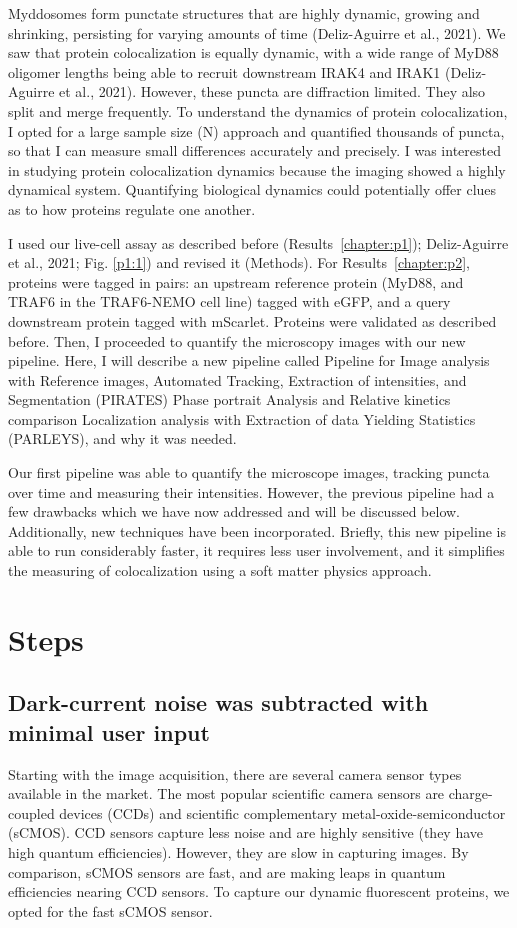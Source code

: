 Myddosomes form punctate structures that are highly dynamic, growing and shrinking, persisting for varying amounts of time (Deliz-Aguirre et al., 2021). We saw that protein colocalization is equally dynamic, with a wide range of MyD88 oligomer lengths being able to recruit downstream IRAK4 and IRAK1 (Deliz-Aguirre et al., 2021). However, these puncta are diffraction limited. They also split and merge frequently. To understand the dynamics of protein colocalization, I opted for a large sample size (N) approach and quantified thousands of puncta, so that I can measure small differences accurately and precisely. I was interested in studying protein colocalization dynamics because the imaging showed a highly dynamical system. Quantifying biological dynamics could potentially offer clues as to how proteins regulate one another.

I used our live-cell assay as described before (Results~\ref{chapter:p1}); Deliz-Aguirre et al., 2021; Fig. \ref{p1:1}) and revised it (Methods). For Results~\ref{chapter:p2}, proteins were tagged in pairs: an upstream reference protein (MyD88, and TRAF6 in the TRAF6-NEMO cell line) tagged with eGFP, and a query downstream protein tagged with mScarlet. Proteins were validated as described before. Then, I proceeded to quantify the microscopy images with our new pipeline. Here, I will describe a new pipeline called Pipeline for Image analysis with Reference images, Automated Tracking, Extraction of intensities, and Segmentation (PIRATES) Phase portrait Analysis and Relative kinetics comparison Localization analysis with Extraction of data Yielding Statistics (PARLEYS), and why it was needed.

Our first pipeline was able to quantify the microscope images, tracking puncta over time and measuring their intensities. However, the previous pipeline had a few drawbacks which we have now addressed and will be discussed below. Additionally, new techniques have been incorporated. Briefly, this new pipeline is able to run considerably faster, it requires less user involvement, and it simplifies the measuring of colocalization using a soft matter physics approach.

\section{Steps}
\subsection{Dark-current noise was subtracted with minimal user input}
Starting with the image acquisition, there are several camera sensor types available in the market. The most popular scientific camera sensors are charge-coupled devices (CCDs) and scientific complementary metal-oxide-semiconductor (sCMOS). CCD sensors capture less noise and are highly sensitive (they have high quantum efficiencies). However, they are slow in capturing images. By comparison, sCMOS sensors are fast, and are making leaps in quantum efficiencies nearing CCD sensors. To capture our dynamic fluorescent proteins, we opted for the fast sCMOS sensor.

